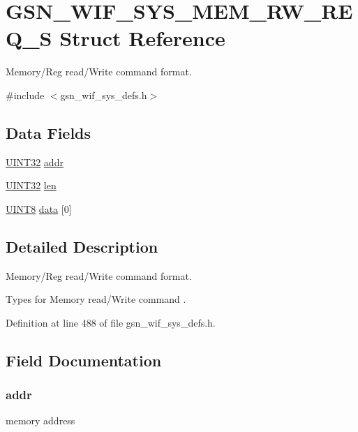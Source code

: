 \hypertarget{a00357}{
\section{GSN\_\-WIF\_\-SYS\_\-MEM\_\-RW\_\-REQ\_\-S Struct Reference}
\label{a00357}
}


Memory/Reg read/Write command format.  




{\ttfamily \#include $<$gsn\_\-wif\_\-sys\_\-defs.h$>$}

\subsection*{Data Fields}
\begin{DoxyCompactItemize}
\item 
\hyperlink{a00660_gae1e6edbbc26d6fbc71a90190d0266018}{UINT32} \hyperlink{a00357_a211571ed47a0fee2d898236395234dab}{addr}
\item 
\hyperlink{a00660_gae1e6edbbc26d6fbc71a90190d0266018}{UINT32} \hyperlink{a00357_ab9abc6ede61238a05664f9c37e4412c3}{len}
\item 
\hyperlink{a00660_gab27e9918b538ce9d8ca692479b375b6a}{UINT8} \hyperlink{a00357_a29500e452cff835f2b70d1dff36f918a}{data} \mbox{[}0\mbox{]}
\end{DoxyCompactItemize}


\subsection{Detailed Description}
Memory/Reg read/Write command format. 

Types for Memory read/Write command . 

Definition at line 488 of file gsn\_\-wif\_\-sys\_\-defs.h.



\subsection{Field Documentation}
\hypertarget{a00357_a211571ed47a0fee2d898236395234dab}{
\subsubsection[{addr}]{ {\bf addr}}}
\label{a00357_a211571ed47a0fee2d898236395234dab}
memory address 

